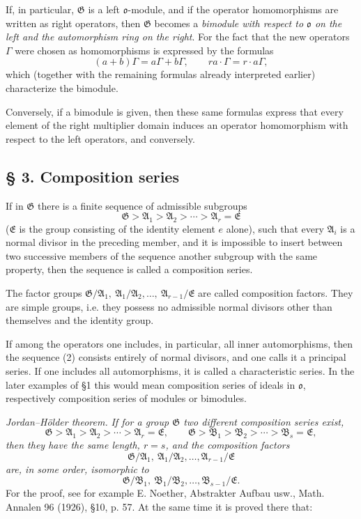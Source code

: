 \documentclass[11pt]{article}
\providecommand{\mG}{\mathfrak{G}}
\providecommand{\mA}{\mathfrak{A}}
\providecommand{\mB}{\mathfrak{B}}
\providecommand{\mE}{\mathfrak{E}}
\providecommand{\mo}{\mathfrak{o}}
\begin{document}
If, in particular, $\mG$ is a left $\mo$-module, and if the operator homomorphisms are written as right operators, then $\mG$ becomes a \emph{bimodule with respect to $\mo$ on the left and the automorphism ring on the right}. For the fact that the new operators $\Gamma$ were chosen as homomorphisms is expressed by the formulas
\[
        (a+b)\Gamma=a\Gamma+b\Gamma,
        \qquad ra\cdot\Gamma=r\cdot a\Gamma,
\]
which (together with the remaining formulas already interpreted earlier) characterize the bimodule.

Conversely, if a bimodule is given, then these same formulas express that every element of the right multiplier domain induces an operator homomorphism with respect to the left operators, and conversely.

\subsection*{§ 3. Composition series}

If in $\mG$ there is a finite sequence of admissible subgroups
\[
        \mG>\mA_1>\mA_2>\cdots>\mA_r=\mE \tag{2}
\]
($\mE$ is the group consisting of the identity element $e$ alone), such that every $\mA_i$ is a normal divisor in the preceding member, and it is impossible to insert between two successive members of the sequence another subgroup with the same property, then the sequence is called a composition series.

The factor groups $\mG/\mA_1,\ \mA_1/\mA_2,\ldots,\ \mA_{r-1}/\mE$ are called composition factors. They are simple groups, i.e. they possess no admissible normal divisors other than themselves and the identity group.

If among the operators one includes, in particular, all inner automorphisms, then the sequence (2) consists entirely of normal divisors, and one calls it a principal series. If one includes all automorphisms, it is called a characteristic series. In the later examples of §1 this would mean composition series of ideals in $\mo$, respectively composition series of modules or bimodules.

\emph{Jordan--Hölder theorem.} \emph{If for a group $\mG$ two different composition series exist,}
\[
        \mG>\mA_1>\mA_2>\cdots>\mA_r=\mE,
        \qquad
        \mG>\mB_1>\mB_2>\cdots>\mB_s=\mE,
\]
\emph{then they have the same length, $r=s$, and the composition factors}
\[
        \mG/\mA_1,\ \mA_1/\mA_2,\ldots,\mA_{r-1}/\mE
\]
\emph{are, in some order, isomorphic to}
\[
        \mG/\mB_1,\ \mB_1/\mB_2,\ldots,\mB_{s-1}/\mE.
\]
For the proof, see for example E. Noether, Abstrakter Aufbau usw., Math. Annalen 96 (1926), §10, p. 57. At the same time it is proved there that:
\end{document}
